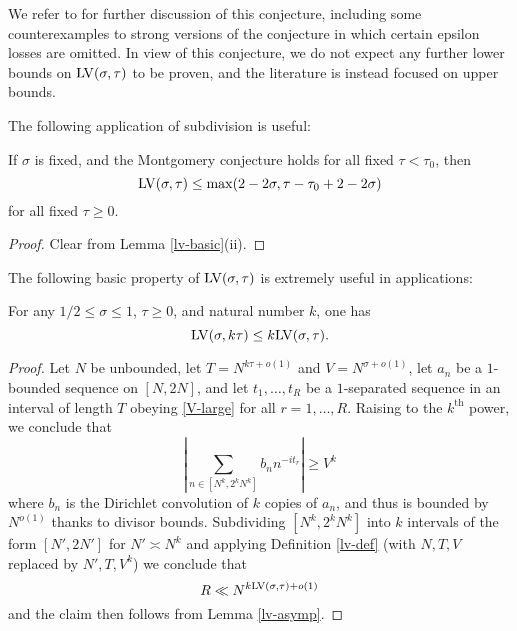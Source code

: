 
We refer to \cite{bourgain_montgomery_1991} for further discussion of this conjecture, including some counterexamples to strong versions of the conjecture in which certain epsilon losses are omitted.  In view of this conjecture, we do not expect any further lower bounds on $\mathrm{LV}(\sigma,\tau)$ to be proven, and the literature is instead focused on upper bounds.

The following application of subdivision is useful:

\begin{lemma}\label{montgomery-subdivide}  If $\sigma$ is fixed, and the Montgomery conjecture holds for all fixed $\tau < \tau_0$, then
\begin{equation}\label{lvt-opt}
    \mathrm{LV}(\sigma, \tau) \leq \max( 2 - 2 \sigma, \tau - \tau_0 + 2 - 2\sigma)
\end{equation}
for all fixed $\tau \geq 0$.
\end{lemma}

\begin{proof}
Clear from Lemma \ref{lv-basic}(ii).
\end{proof}


The following basic property of $\mathrm{LV}(\sigma,\tau)$ is extremely useful in applications:

\begin{lemma}\label{power-lemma}  For any $1/2 \leq \sigma \leq 1$, $\tau \geq 0$, and natural number $k$, one has
    $$ \mathrm{LV}(\sigma, k\tau) \leq k \mathrm{LV}(\sigma, \tau).$$
\end{lemma}


\begin{proof}  Let $N$ be unbounded, let $T = N^{k\tau+o(1)}$ and $V = N^{\sigma+o(1)}$, let $a_n$ be a $1$-bounded sequence on $[N,2N]$, and let $t_1,\dots,t_R$ be a $1$-separated sequence in an interval of length $T$ obeying \eqref{V-large}
for all $r=1,\dots,R$.  Raising to the $k^{\mathrm{th}}$ power, we conclude that
$$ \left|\sum_{n \in [N^k,2^kN^k]} b_n n^{-it_r} \right| \geq V^k$$
where $b_n$ is the Dirichlet convolution of $k$ copies of $a_n$, and thus is bounded by $N^{o(1)}$ thanks to divisor bounds.  Subdividing $[N^k, 2^k N^k]$ into $k$ intervals of the form $[N',2N']$ for $N' \asymp N^k$ and applying Definition \ref{lv-def} (with $N, T, V$ replaced by $N', T, V^k$) we conclude that
$$ R \ll N^{k \mathrm{LV}(\sigma,\tau) + o(1)}$$
and the claim then follows from Lemma \ref{lv-asymp}.
\end{proof}

